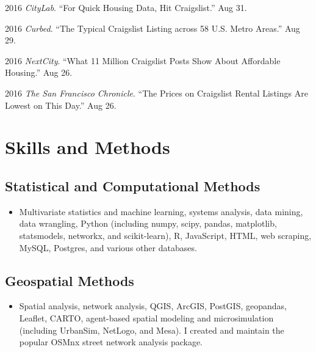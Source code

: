 \documentclass{academiccv}
\begin{document}
\begin{tablist}
\item 2016 \tab \textit{CityLab}. \enquote{For Quick Housing Data, Hit Craigslist.} Aug 31.

\item 2016 \tab \textit{Curbed}. \enquote{The Typical Craigslist Listing across 58 U.S. Metro Areas.} Aug 29.

\item 2016 \tab \textit{NextCity}. \enquote{What 11 Million Craigslist Posts Show About Affordable Housing.} Aug 26.

\item 2016 \tab \textit{The San Francisco Chronicle}. \enquote{The Prices on Craigslist Rental Listings Are Lowest on This Day.} Aug 26.

\end{tablist}



\section*{Skills and Methods}

\subsection*{Statistical and Computational Methods}

\begin{itemize}
	
\item Multivariate statistics and machine learning, systems analysis, data mining, data wrangling, Python (including numpy, scipy, pandas, matplotlib, statsmodels, networkx, and scikit-learn), R, JavaScript, HTML, web scraping, MySQL, Postgres, and various other databases.

\end{itemize}

\subsection*{Geospatial Methods}

\begin{itemize}

\item Spatial analysis, network analysis, QGIS, ArcGIS, PostGIS, geopandas, Leaflet, CARTO, agent-based spatial modeling and microsimulation (including UrbanSim, NetLogo, and Mesa). I created and maintain the popular OSMnx street network analysis package.

\end{itemize}
\end{document}
